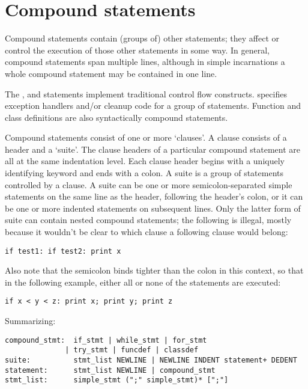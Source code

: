 \chapter{Compound statements}

Compound statements contain (groups of) other statements; they affect
or control the execution of those other statements in some way.  In
general, compound statements span multiple lines, although in simple
incarnations a whole compound statement may be contained in one line.

The \verb@if@, \verb@while@ and \verb@for@ statements implement
traditional control flow constructs.  \verb@try@ specifies exception
handlers and/or cleanup code for a group of statements.  Function and
class definitions are also syntactically compound statements.

Compound statements consist of one or more `clauses'.  A clause
consists of a header and a `suite'.  The clause headers of a
particular compound statement are all at the same indentation level.
Each clause header begins with a uniquely identifying keyword and ends
with a colon.  A suite is a group of statements controlled by a
clause.  A suite can be one or more semicolon-separated simple
statements on the same line as the header, following the header's
colon, or it can be one or more indented statements on subsequent
lines.  Only the latter form of suite can contain nested compound
statements; the following is illegal, mostly because it wouldn't be
clear to which \verb@if@ clause a following \verb@else@ clause would
belong:

\begin{verbatim}
if test1: if test2: print x
\end{verbatim}

Also note that the semicolon binds tighter than the colon in this
context, so that in the following example, either all or none of the
\verb@print@ statements are executed:

\begin{verbatim}
if x < y < z: print x; print y; print z
\end{verbatim}

Summarizing:

\begin{verbatim}
compound_stmt:  if_stmt | while_stmt | for_stmt
              | try_stmt | funcdef | classdef
suite:          stmt_list NEWLINE | NEWLINE INDENT statement+ DEDENT
statement:      stmt_list NEWLINE | compound_stmt
stmt_list:      simple_stmt (";" simple_stmt)* [";"]
\end{verbatim}

